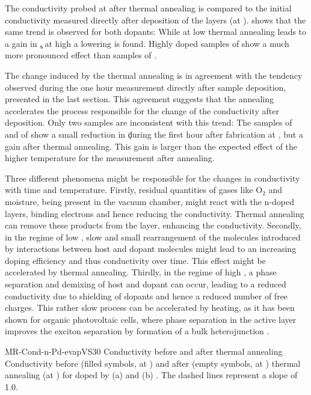 The conductivity probed at \T[30] after thermal annealing is compared to the initial conductivity measured directly after deposition of the layers (at \T[25]).  shows that the same trend is observed for both dopants: While at low \CLongs thermal annealing leads to a gain in \c, at high \C a lowering is found.
Highly doped samples of \CrPd show a much more pronounced effect than samples of \WPd.

The change induced by the thermal annealing is in agreement with the tendency observed during the one hour measurement directly after sample deposition, presented in the last section. This agreement suggests that the annealing accelerates the process responsible for the change of the conductivity after deposition. Only two samples are inconsistent with this trend: The samples of \C[0.045] and  of \CrPd show a small reduction in \c during the first hour after fabrication at \T[25], but a gain after thermal annealing. This gain is larger than the expected effect of the  higher temperature for the measurement after annealing.

Three different phenomena might be responsible for the changes in conductivity with time and temperature.
Firstly, residual quantities of gases like O$_2$ and moisture, being present in the vacuum chamber, might react with the n-doped layers, binding electrons and hence reducing the conductivity. Thermal annealing can remove these products from the layer, enhancing the conductivity\cite{Fujimori1994}.
Secondly, in the regime of low \CLong, slow and small rearrangement of the molecules introduced by interactions between host and dopant molecules might lead to an increasing doping efficiency and thus conductivity over time. This effect might be accelerated by thermal annealing.
Thirdly, in the regime of high \CLong, a phase separation and demixing of host and dopant can occur, leading to a reduced conductivity due to shielding of dopants and hence a reduced number of free charges. This rather slow process can be accelerated by heating, as it has been shown for organic photovoltaic cells, where phase separation in the active layer improves the exciton separation by formation of a bulk heterojunction \cite{Suemori2004}.

%
\cBild
{MR-Cond-n-Pd-evapVS30}
{Conductivity before and after thermal annealing}
{Conductivity before (filled symbols, at \T[25]) and after (empty symbols, at \T[30]) thermal annealing (at \T[100]) for \CS doped by (a) \CrPd and (b) \WPd. The dashed lines represent a slope of 1.0.
}
%

